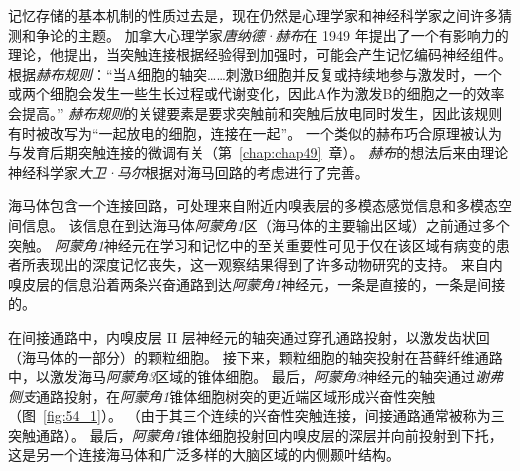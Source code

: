 记忆存储的基本机制的性质过去是，现在仍然是心理学家和神经科学家之间许多猜测和争论的主题。
加拿大心理学家\textit{唐纳德·赫布}在 1949 年提出了一个有影响力的理论，他提出，当突触连接根据经验得到加强时，可能会产生记忆编码神经组件。
根据\textit{赫布规则}：“当A细胞的轴突……刺激B细胞并反复或持续地参与激发时，一个或两个细胞会发生一些生长过程或代谢变化，因此A作为激发B的细胞之一的效率会提高。”
\textit{赫布规则}的关键要素是要求突触前和突触后放电同时发生，因此该规则有时被改写为“一起放电的细胞，连接在一起”。
一个类似的赫布巧合原理被认为与发育后期突触连接的微调有关（第~\ref{chap:chap49}~章）。
\textit{赫布}的想法后来由理论神经科学家\textit{大卫·马尔}根据对海马回路的考虑进行了完善。


海马体包含一个连接回路，可处理来自附近内嗅表层的多模态感觉信息和多模态空间信息。
该信息在到达海马体\textit{阿蒙角1}区（海马体的主要输出区域）之前通过多个突触。
\textit{阿蒙角1}神经元在学习和记忆中的至关重要性可见于仅在该区域有病变的患者所表现出的深度记忆丧失，这一观察结果得到了许多动物研究的支持。
来自内嗅皮层的信息沿着两条兴奋通路到达\textit{阿蒙角1}神经元，一条是直接的，一条是间接的。


在间接通路中，内嗅皮层 II 层神经元的轴突通过穿孔通路投射，以激发齿状回（海马体的一部分）的颗粒细胞。
接下来，颗粒细胞的轴突投射在苔藓纤维通路中，以激发海马\textit{阿蒙角3}区域的锥体细胞。
最后，\textit{阿蒙角3}神经元的轴突通过\textit{谢弗侧支}通路投射，在\textit{阿蒙角1}锥体细胞树突的更近端区域形成兴奋性突触（图~\ref{fig:54_1}）。
（由于其三个连续的兴奋性突触连接，间接通路通常被称为三突触通路）。
最后，\textit{阿蒙角1}锥体细胞投射回内嗅皮层的深层并向前投射到下托，这是另一个连接海马体和广泛多样的大脑区域的内侧颞叶结构。


